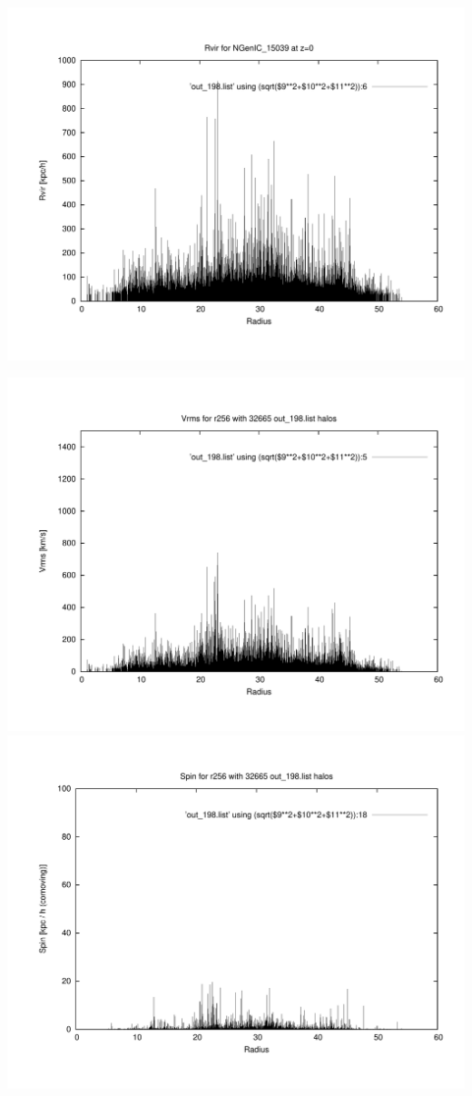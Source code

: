 \includegraphics[scale=0.3]{NGenIC_15039/plot_rvir_z0.pdf}

\includegraphics[scale=0.3]{NGenIC_15039/plot_Vrms_out_198.pdf}
\includegraphics[scale=0.3]{NGenIC_15039/plot_spin_out_198.pdf}
% 
%
%
%
%
%
%
%


